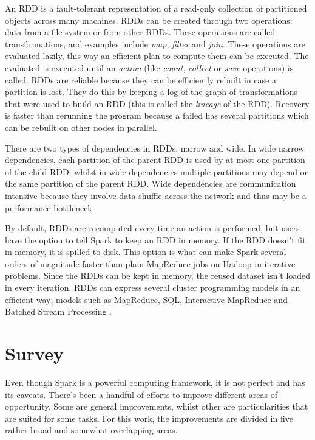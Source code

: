\documentclass{article}
\begin{document}
An RDD is a fault-tolerant representation of a read-only collection of partitioned objects across many machines. RDDs can be created through two operations: data from a file system or from other RDDs. These operations are called transformations, and examples include \textit{map}, \textit{filter} and \textit{join}. These operations are evaluated lazily, this way an efficient plan to compute them can be executed. The evaluated is executed until an \textit{action} (like \textit{count}, \textit{collect} or \textit{save} operations) is called. RDDs are reliable because they can be efficiently rebuilt in case a partition is lost. They do this by keeping a log of the graph of transformations that were used to build an RDD (this is called the \textit{lineage} of the RDD). Recovery is faster than rerunning the program because a failed has several partitions which can be rebuilt on other nodes in parallel.

There are two types of dependencies in RDDs: narrow and wide. In wide narrow dependencies, each partition of the parent RDD is used by at most one partition of the child RDD; whilst in wide dependencies multiple partitions may depend on the same partition of the parent RDD. Wide dependencies are communication intensive because they involve data shuffle across the network and thus may be a performance bottleneck.

By default, RDDs are recomputed every time an action is performed, but users have the option to tell Spark to keep an RDD in memory. If the RDD doesn't fit in memory, it is spilled to disk. This option is what can make Spark several orders of magnitude faster than plain MapReduce jobs on Hadoop in iterative problems. Since the RDDs can be kept in memory, the reused dataset isn't loaded in every iteration. RDDs can express several cluster programming models in an efficient way; models such as MapReduce, SQL, Interactive MapReduce and Batched Stream Processing \cite{zaharia_resilient_2012}.



\section{Survey}
\label{sec:survey}

Even though Spark is a powerful computing framework, it is not perfect and has its caveats. There's been a handful of efforts to improve different areas of opportunity. Some are general improvements, whilst other are particularities that are suited for some tasks. For this work, the improvements are divided in five rather broad and somewhat overlapping areas.
\end{document}
